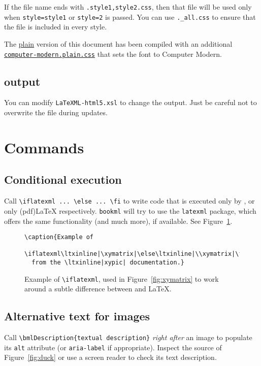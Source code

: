 \documentclass[a4paper,british]{article}
\def\ltxinline{\lstinline[style=bookml]}
\def\htmlinline{\lstinline[language=html]}
\begin{document}
If the file name ends with \lstinline|.style1,style2.css|, then that file will be used only when \lstinline|style=style1| or \lstinline|style=2| is passed. You can use \lstinline|._all.css| to ensure that the file is included in every style.

The \href{https://vlmantova.github.io/bookml/index.plain.html}{plain} version of this document has been compiled with an additional \href{https://vlmantova.github.io/bookml/bmluser/computer-modern.plain.css}{\texttt{computer-modern.plain.css}} that sets the font to Computer Modern.

\subsection{\HTML{} output}

You can modify \lstinline|LaTeXML-html5.xsl| to change the \HTML{} output. Just be careful not to overwrite the file during updates.

\section{Commands}

\subsection{Conditional execution}
Call \ltxinline|\iflatexml ... \else ... \fi| to write code that is executed only by \LaTeXML{}, or only (pdf)\LaTeX{} respectively. \lstinline|bookml| will try to use the \lstinline|latexml| package, which offers the same functionality (and much more), if available. See Figure~\ref{fig:iflatexml}.

\begin{figure}[hb]
  \begin{lstlisting}[style=bookml]
\caption{Example of
  \iflatexml\ltxinline|\xymatrix|\else\ltxinline|\\xymatrix|\fi{}
  from the \ltxinline|xypic| documentation.}
  \end{lstlisting}
  \caption{Example of \texttt{\textbackslash{}iflatexml}, used in Figure~\ref{fig:xymatrix} to work around a subtle difference between \LaTeXML{} and \LaTeX{}.}
  \label{fig:iflatexml}
\end{figure}

\subsection{Alternative text for images}
Call \ltxinline|\bmlDescription{textual description}| \emph{right after} an image to populate its \htmlinline|alt| attribute (or \ltxinline|aria-label| if appropriate). Inspect the \HTML{} source of Figure~\ref{fig:duck} or use a screen reader to check its text description.
\end{document}
